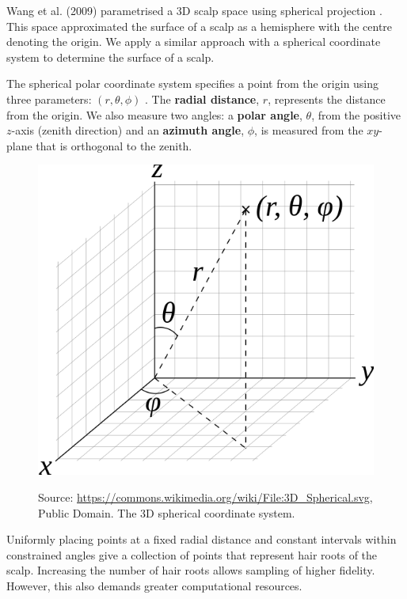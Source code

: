 \documentclass[ %
author={Dillon Keith Diep},
supervisor={Dr. Carl Henrik Ek},
degree={MEng},
title={ART-CG:},
subtitle={Assisted Real-time Content Generation of 3D Hair by Learning Manifolds},
type={Research},
year={2017} ]{dissertation}
\begin{document}
Wang et al. (2009) parametrised a 3D scalp space using spherical projection \cite{examplebasedhair}. This space approximated the surface of a scalp as a hemisphere with the centre denoting the origin. We apply a similar approach with a spherical coordinate system to determine the surface of a scalp.

The spherical polar coordinate system specifies a point from the origin using three parameters:  $(r,\theta,\phi)$ \cite[pp.123-126]{sphericalcoords}. The \textbf{radial distance}, $r$, represents the distance from the origin. We also measure two angles: a \textbf{polar angle}, $\theta$, from the positive $z$-axis (zenith direction) and an \textbf{azimuth angle}, $\phi$, is measured from the $xy$-plane that is orthogonal to the zenith.

\begin{figure}[!h]
	\centering
	\includegraphics[scale=0.25]{images/sphereCoords}\\
	\caption{Source: \href{https://commons.wikimedia.org/wiki/File:3D_Spherical.svg}{https://commons.wikimedia.org/wiki/File:3D\_Spherical.svg}, Public Domain. The 3D spherical coordinate system.}
\end{figure}

Uniformly placing points at a fixed radial distance and constant intervals within constrained angles give a collection of points that represent hair roots of the scalp. Increasing the number of hair roots allows sampling of higher fidelity. However, this also demands greater computational resources.
\end{document}
